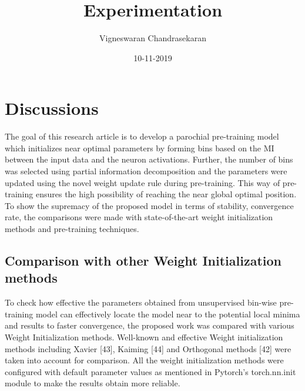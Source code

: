 \documentclass{article}
\title{Experimentation}
\author{Vigneswaran Chandrasekaran}
\date{10-11-2019}
\begin{document}
\section{Discussions}
The goal of this research article is to develop a parochial pre-training model which
initializes near optimal parameters by forming bins based on the MI between the input
data and the neuron activations. Further, the number of bins was selected using partial
information decomposition and the parameters were updated using the novel weight
update rule during pre-training. This way of pre-training ensures the high possibility of
reaching the near global optimal position. To show the supremacy of the proposed model
in terms of stability, convergence rate, the comparisons were made with state-of-the-art
weight initialization methods and pre-training techniques.

\subsection{Comparison with other Weight Initialization methods}
To check how effective the parameters obtained from unsupervised bin-wise pre-training
model can effectively locate the model near to the potential local minima and results to
faster convergence, the proposed work was compared with various Weight Initialization
methods. Well-known and effective Weight initialization methods including Xavier [43],
Kaiming [44] and Orthogonal methods [42] were taken into account for comparison. All the weight initialization methods were configured with default parameter values as mentioned in Pytorch's torch.nn.init module to make the results obtain more reliable.
\end{document}
